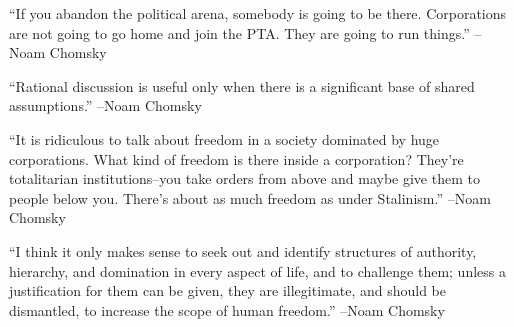 \documentclass{article}%
\begin{document}
\linebreak%
\vspace{1mm}%
\begin{minipage}{\textwidth}%
\flushleft%
“If you abandon the political arena, somebody is going to be there. Corporations are not going to go home and join the PTA. They are going to run things.”%
\linebreak%
\vspace{1mm}%
–Noam Chomsky%
\linebreak%
\vspace{1mm}%
\end{minipage}%
\linebreak%
\vspace{1mm}%
\begin{minipage}{\textwidth}%
\flushleft%
“Rational discussion is useful only when there is a significant base of shared assumptions.”%
\linebreak%
\vspace{1mm}%
–Noam Chomsky%
\linebreak%
\vspace{1mm}%
\end{minipage}%
\linebreak%
\vspace{1mm}%
\begin{minipage}{\textwidth}%
\flushleft%
“It is ridiculous to talk about freedom in a society dominated by huge corporations. What kind of freedom is there inside a corporation? They're totalitarian institutions–you take orders from above and maybe give them to people below you. There's about as much freedom as under Stalinism.”%
\linebreak%
\vspace{1mm}%
–Noam Chomsky%
\linebreak%
\vspace{1mm}%
\end{minipage}%
\linebreak%
\vspace{1mm}%
\begin{minipage}{\textwidth}%
\flushleft%
“I think it only makes sense to seek out and identify structures of authority, hierarchy, and domination in every aspect of life, and to challenge them; unless a justification for them can be given, they are illegitimate, and should be dismantled, to increase the scope of human freedom.”%
\linebreak%
\vspace{1mm}%
–Noam Chomsky%
\linebreak%
\vspace{1mm}%
\end{minipage}%
\end{document}
